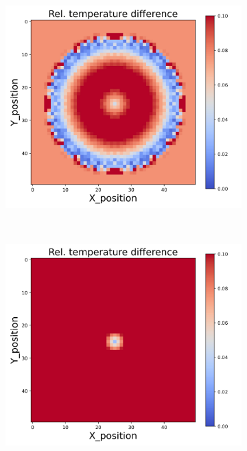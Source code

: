 {\begin{figure}[h]
\begin{minipage}{\textwidth}
\begin{subfigure}{0.27\textwidth}
        \end{subfigure}
        \begin{subfigure}{0.27\textwidth}
            \centering
            \includegraphics[width=\textwidth]{figures/raw_data/31/lin_square/T_bias.jpg}
        \end{subfigure}
    \end{minipage}\\
    \begin{minipage}{\textwidth}
        \centering
        \begin{subfigure}{0.27\textwidth}
            \centering
            \includegraphics[width=\textwidth]{figures/raw_data/32/lin_square/T_bias.jpg}

\end{subfigure}
\end{minipage}
\end{figure}}
